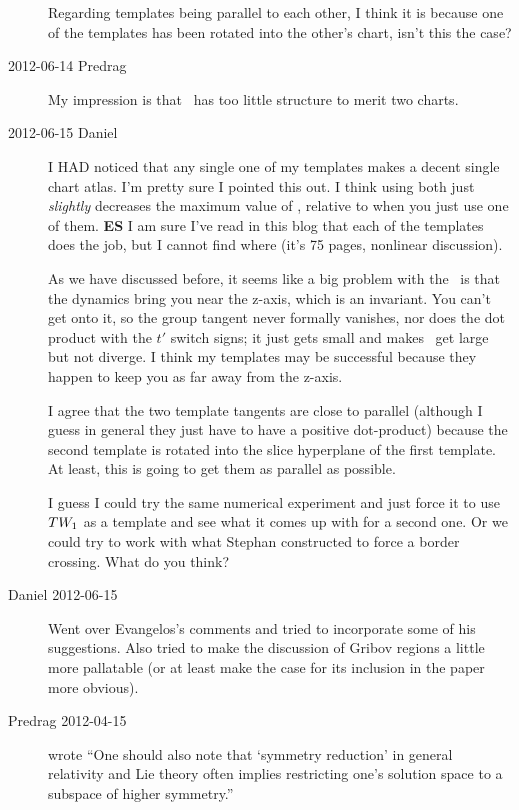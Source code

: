 \begin{description}
Regarding templates being parallel to each other, I think it is because one of
the templates has been rotated into the other's chart, isn't this the case?

\item[2012-06-14 Predrag]
My impression is that \cLf\ has too little structure to merit two charts.

\item[2012-06-15 Daniel] I HAD noticed that any single one of my
templates makes a decent single chart atlas. I'm pretty sure I pointed
this out. I think using both just \emph{slightly} decreases the maximum
value of \phaseVel, relative to when you just use one of them.
{\bf ES} I am sure I've read in this blog that each of the templates does the
job, but I cannot find where (it's 75 pages, nonlinear discussion).

As we have discussed before, it seems like a big problem with the \cLe\
is that the dynamics bring you near the z-axis, which is an invariant.
You can't get onto it, so the group tangent never formally vanishes, nor
does the dot product with the $t'$ switch signs; it just gets small and
makes \phaseVel\ get large but not diverge. I think my templates may be
successful because they happen to keep you as far away from the z-axis.

I agree that the two template tangents are close to parallel (although I
guess in general they just have to have a positive dot-product) because
the second template is rotated into the slice hyperplane of the first
template. At least, this is going to get them as parallel as possible.

I guess I could try the same numerical experiment and just force it to
use $TW_{1}$ as a template and see what it comes up with for a second
one. Or we could try to work with what Stephan constructed to force a
border crossing. What do you think?

\item[Daniel 2012-06-15] Went over Evangelos's comments and tried to
incorporate some of his suggestions. Also tried to make the discussion of
Gribov regions a little more pallatable (or at least make the case for
its inclusion in the paper more obvious).

\item[Predrag 2012-04-15] wrote ``One should also note that `symmetry reduction'
in general relativity\rf{SKMacHH09} and Lie theory often implies
restricting one's solution space to a subspace of higher symmetry.''


\end{description}
